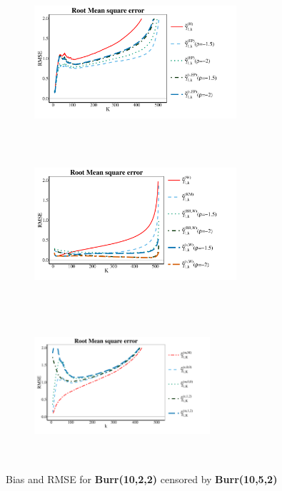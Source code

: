 \begin{landscape}
\begin{figure}[h]
	\begin{subfigure}[h]{0.3\linewidth}
		\includegraphics[width=7.5cm,height=5.5cm]{./plots/paper2/RMSE_simulations_B12_H.pdf}
	\end{subfigure}
		\hspace{\fill}
		\begin{subfigure}[h]{0.3\linewidth}
			\includegraphics[width=7.5cm,height=5.5cm]{./plots/paper2/RMSE_simulations_B12_W.pdf}
		\end{subfigure}
		\hspace{\fill}
		\begin{subfigure}[h]{0.3\linewidth}
			\includegraphics[width=6.5cm,height=5.5cm]{./plots/paper2/RMSE_simulations_B12_B.pdf}
		\end{subfigure}
		\caption{Bias and RMSE for \textbf{Burr(10,2,2)} censored by \textbf{Burr(10,5,2)}}
\label{paper2:fig1}
\end{figure}


\end{landscape}
